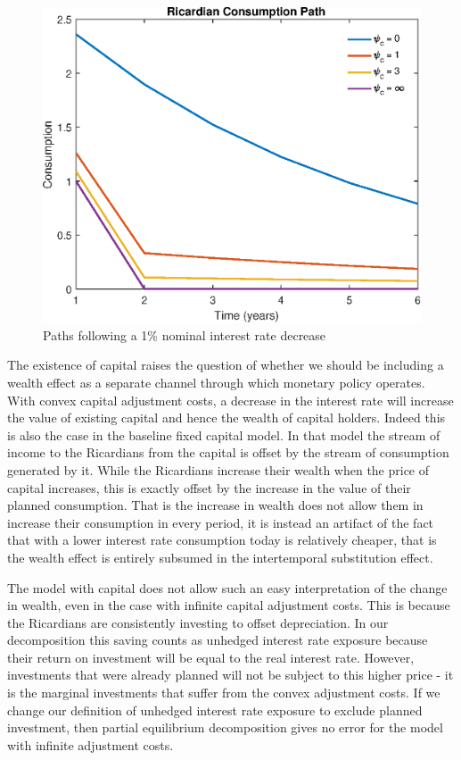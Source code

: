 \documentclass[titlepage]{\econtex}\newcommand{\texname}{ConsumptionHeterogeneity}
\begin{document}
\begin{figure}
\begin{centering}
		\includegraphics[scale=0.4]{../Matlab/DynareCode/Figures/TANK_capital_IRF_c_R.eps}
		\caption{Paths following a 1\% nominal interest rate decrease}
		\label{fig:iandcpath}
	\end{centering}
\end{figure}

The existence of capital raises the question of whether we should be including a wealth effect as a separate channel through which monetary policy operates. With convex capital adjustment costs, a decrease in the interest rate will increase the value of existing capital and hence the wealth of capital holders. Indeed this is also the case in the baseline fixed capital model. In that model the stream of income to the Ricardians from the capital is  offset by the stream of consumption generated by it. While the Ricardians increase their wealth when the price of capital increases, this is exactly offset by the increase in the value of their planned consumption. That is the increase in wealth does not allow them in increase their consumption in every period, it is instead an artifact of the fact that with a lower interest rate consumption today is relatively cheaper, that is the wealth effect is entirely subsumed in the intertemporal substitution effect.

The model with capital does not allow such an easy interpretation of the change in wealth, even in the case with infinite capital adjustment costs. This is because the Ricardians are consistently investing to offset depreciation. In our decomposition this saving counts as unhedged interest rate exposure because their return on investment will be equal to the real interest rate. However, investments that were already planned will not be subject to this higher price - it is the marginal investments that suffer from the convex adjustment costs. If we change our definition of unhedged interest rate exposure to exclude planned investment, then partial equilibrium decomposition gives no error for the model with infinite adjustment costs.
\end{document}
